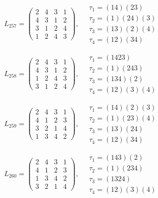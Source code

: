 $L_{257} = \begin{pmatrix} 2 & 4 & 3 & 1 \\ 4 & 3 & 1 & 2 \\ 3 & 1 & 2 & 4 \\ 1 & 2 & 4 & 3 \end{pmatrix}, \quad \begin{matrix} \tau_{1} = (1 4)(2 3) \\ \tau_{2} = (1)(2 4)(3) \\ \tau_{3} = (1 3)(2)(4) \\ \tau_{4} = (1 2)(3 4) \end{matrix}$

$L_{258} = \begin{pmatrix} 2 & 4 & 3 & 1 \\ 4 & 3 & 1 & 2 \\ 1 & 2 & 4 & 3 \\ 3 & 1 & 2 & 4 \end{pmatrix}, \quad \begin{matrix} \tau_{1} = (1 4 2 3) \\ \tau_{2} = (1)(2 4 3) \\ \tau_{3} = (1 3 4)(2) \\ \tau_{4} = (1 2)(3)(4) \end{matrix}$

$L_{259} = \begin{pmatrix} 2 & 4 & 3 & 1 \\ 4 & 1 & 2 & 3 \\ 3 & 2 & 1 & 4 \\ 1 & 3 & 4 & 2 \end{pmatrix}, \quad \begin{matrix} \tau_{1} = (1 4)(2)(3) \\ \tau_{2} = (1)(2 3)(4) \\ \tau_{3} = (1 3)(2 4) \\ \tau_{4} = (1 2)(3 4) \end{matrix}$

$L_{260} = \begin{pmatrix} 2 & 4 & 3 & 1 \\ 4 & 1 & 2 & 3 \\ 1 & 3 & 4 & 2 \\ 3 & 2 & 1 & 4 \end{pmatrix}, \quad \begin{matrix} \tau_{1} = (1 4 3)(2) \\ \tau_{2} = (1)(2 3 4) \\ \tau_{3} = (1 3 2 4) \\ \tau_{4} = (1 2)(3)(4) \end{matrix}$

